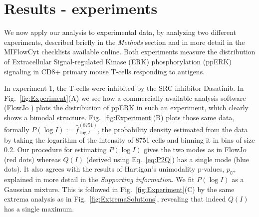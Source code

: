 \documentclass[11pt,a4paper,draft]{article}
\begin{document}
\section*{Results - experiments}

We now apply our analysis to experimental data, by analyzing two different experiments, described briefly in the \emph{Methods} section and in more detail in the MIFlowCyt checklists available online. Both experiments measure the distribution of Extracellular Signal-regulated Kinase (ERK) phosphorylation (ppERK) signaling in CD8+ primary mouse T-cells responding to antigens. 

\smallskip
In experiment 1, the T-cells were inhibited by the SRC inhibitor Dasatinib. In Fig.~\ref{fig:Experiment}(A) we see how a commercially-available analysis software (FlowJo \cite{FlowJo}) plots the distribution of ppERK in such an experiment, which clearly shows a bimodal structure. Fig.~\ref{fig:Experiment}(B) plots those same data, formally $P(\log I) := \hat{f}_{\log I}^{(8751)}$, the probability density estimated from the data by taking the logarithm of the intensity of 8751 cells and binning it in bins of size 0.2. Our procedure for estimating $P(\log I)$ gives the two modes as in FlowJo (red dots) whereas $Q(I)$ (derived using Eq.~\ref{eq:P2Q}) has a single mode (blue dots). It also agrees with the results of Hartigan's unimodality p-values, $p_U$, explained in more detail in the \emph{Supporting information}. We fit $P(\log I)$ as a Gaussian mixture. This is followed in Fig.~\ref{fig:Experiment}(C) by the same extrema analysis as in Fig.~\ref{fig:ExtremaSolutions}, revealing that indeed $Q(I)$ has a single maximum.
\smallskip
\end{document}

